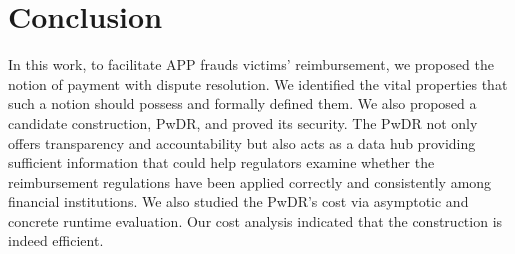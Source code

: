 
 \vspace{-2mm}
\section{Conclusion}\label{sec::conclusion}



In this work, to facilitate APP frauds victims’ reimbursement,  we proposed the notion of payment with dispute resolution. We identified the vital properties that such a notion should possess and formally defined them. We also proposed a candidate construction,  PwDR, and proved its security.  The PwDR not only offers transparency and accountability but also acts as a data hub providing sufficient information that could help regulators examine whether the reimbursement regulations have been applied correctly and consistently among financial institutions.  We also studied the PwDR's cost via asymptotic and concrete runtime evaluation. Our cost analysis indicated that the construction is indeed efficient. 






